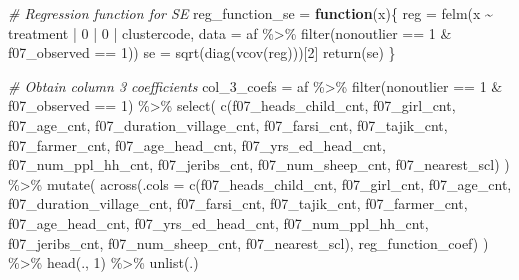 \documentclass[
]{article}
\newenvironment{Shaded}{\begin{snugshade}}{\end{snugshade}}
\newcommand{\AttributeTok}[1]{\textcolor[rgb]{0.77,0.63,0.00}{#1}}
\newcommand{\CommentTok}[1]{\textcolor[rgb]{0.56,0.35,0.01}{\textit{#1}}}
\newcommand{\ControlFlowTok}[1]{\textcolor[rgb]{0.13,0.29,0.53}{\textbf{#1}}}
\newcommand{\DecValTok}[1]{\textcolor[rgb]{0.00,0.00,0.81}{#1}}
\newcommand{\FunctionTok}[1]{\textcolor[rgb]{0.00,0.00,0.00}{#1}}
\newcommand{\NormalTok}[1]{#1}
\newcommand{\OtherTok}[1]{\textcolor[rgb]{0.56,0.35,0.01}{#1}}
\newcommand{\SpecialCharTok}[1]{\textcolor[rgb]{0.00,0.00,0.00}{#1}}
\begin{document}
\begin{Shaded}
\begin{Highlighting}[]
\CommentTok{\# Regression function for SE}
\NormalTok{reg\_function\_se }\OtherTok{=} \ControlFlowTok{function}\NormalTok{(x)\{}
\NormalTok{  reg }\OtherTok{=} \FunctionTok{felm}\NormalTok{(x }\SpecialCharTok{\textasciitilde{}}\NormalTok{ treatment }\SpecialCharTok{|} \DecValTok{0} \SpecialCharTok{|} \DecValTok{0} \SpecialCharTok{|}\NormalTok{ clustercode, }
             \AttributeTok{data =}\NormalTok{ af }\SpecialCharTok{\%\textgreater{}\%} \FunctionTok{filter}\NormalTok{(nonoutlier }\SpecialCharTok{==} \DecValTok{1} \SpecialCharTok{\&}\NormalTok{ f07\_observed }\SpecialCharTok{==} \DecValTok{1}\NormalTok{))}
\NormalTok{  se }\OtherTok{=} \FunctionTok{sqrt}\NormalTok{(}\FunctionTok{diag}\NormalTok{(}\FunctionTok{vcov}\NormalTok{(reg)))[}\DecValTok{2}\NormalTok{]}
  \FunctionTok{return}\NormalTok{(se)}
\NormalTok{\}}



\CommentTok{\# Obtain column 3 coefficients}
\NormalTok{col\_3\_coefs }\OtherTok{=}\NormalTok{ af }\SpecialCharTok{\%\textgreater{}\%} 
  \FunctionTok{filter}\NormalTok{(nonoutlier }\SpecialCharTok{==} \DecValTok{1} \SpecialCharTok{\&}\NormalTok{ f07\_observed }\SpecialCharTok{==} \DecValTok{1}\NormalTok{) }\SpecialCharTok{\%\textgreater{}\%} 
  \FunctionTok{select}\NormalTok{(}
    \FunctionTok{c}\NormalTok{(f07\_heads\_child\_cnt, f07\_girl\_cnt, f07\_age\_cnt, f07\_duration\_village\_cnt,}
\NormalTok{                   f07\_farsi\_cnt,  f07\_tajik\_cnt,  f07\_farmer\_cnt, }
\NormalTok{                   f07\_age\_head\_cnt, f07\_yrs\_ed\_head\_cnt, f07\_num\_ppl\_hh\_cnt, f07\_jeribs\_cnt, }
\NormalTok{                   f07\_num\_sheep\_cnt, f07\_nearest\_scl)}
\NormalTok{  ) }\SpecialCharTok{\%\textgreater{}\%} 
  \FunctionTok{mutate}\NormalTok{(}
  \FunctionTok{across}\NormalTok{(}\AttributeTok{.cols =} \FunctionTok{c}\NormalTok{(f07\_heads\_child\_cnt, f07\_girl\_cnt, f07\_age\_cnt, f07\_duration\_village\_cnt,}
\NormalTok{                   f07\_farsi\_cnt,  f07\_tajik\_cnt,  f07\_farmer\_cnt, }
\NormalTok{                   f07\_age\_head\_cnt, f07\_yrs\_ed\_head\_cnt, f07\_num\_ppl\_hh\_cnt, f07\_jeribs\_cnt, }
\NormalTok{                   f07\_num\_sheep\_cnt, f07\_nearest\_scl), reg\_function\_coef)}
\NormalTok{  ) }\SpecialCharTok{\%\textgreater{}\%} \FunctionTok{head}\NormalTok{(., }\DecValTok{1}\NormalTok{) }\SpecialCharTok{\%\textgreater{}\%} \FunctionTok{unlist}\NormalTok{(.)}


\end{Highlighting}
\end{Shaded}
\end{document}
